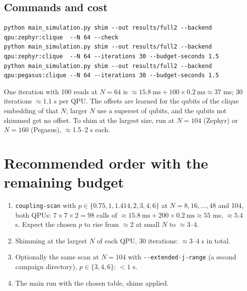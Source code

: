 \documentclass[11pt,a4paper]{article}
\newcommand{\code}[1]{\nolinkurl{#1}}
\begin{document}
\subsection{Commands and cost}
\begin{verbatim}
python main_simulation.py shim --out results/full2 --backend qpu:zephyr:clique  --N 64 --check
python main_simulation.py shim --out results/full2 --backend qpu:zephyr:clique  --N 64 --iterations 30 --budget-seconds 1.5
python main_simulation.py shim --out results/full2 --backend qpu:pegasus:clique --N 64 --iterations 30 --budget-seconds 1.5
\end{verbatim}
One iteration with 100 reads at $N=64$ is $\approx15.8\ \text{ms}+100\times0.2\ \text{ms}\approx37$ ms; 30 iterations $\approx1.1$ s per QPU. The offsets are learned for the qubits of the clique embedding of that $N$; larger $N$ use a superset of qubits, and the qubits not shimmed get no offset. To shim at the largest size, run at $N=104$ (Zephyr) or $N=160$ (Pegasus), $\approx$1.5--2 s each.

\section{Recommended order with the remaining budget}
\begin{enumerate}
\item \code{coupling-scan} with $p\in\{0.75,1,1.414,2,3,4,6\}$ at $N=8,16,\dots,48$ and 104, both QPUs: $7\times7\times2=98$ calls of $\approx15.8\ \text{ms}+200\times0.2\ \text{ms}\approx55$ ms, $\approx5.4$ s. Expect the chosen $p$ to rise from $\approx2$ at small $N$ to $\approx3$--$4$.
\item Shimming at the largest $N$ of each QPU, 30 iterations: $\approx3$--$4$ s in total.
\item Optionally the same scan at $N=104$ with \code{--extended-j-range} (a second campaign directory), $p\in\{3,4,6\}$: $<1$ s.
\item The main run with the chosen table, shims applied.
\end{enumerate}
\end{document}
